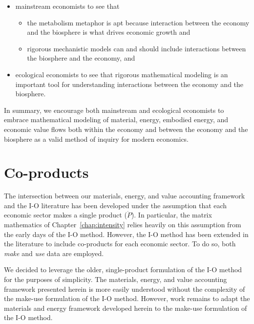 \begin{itemize}
	\item{mainstream economists to see that}
	\begin{itemize}
		\item{the metabolism metaphor is apt because 
		interaction between the economy and the biosphere is 
		what drives economic growth and}
		\item{rigorous mechanistic models can and should include 
		interactions between the biosphere and the economy, and} 
	\end{itemize}
	\item{ecological economists to see that rigorous mathematical modeling
	is an important tool for understanding interactions
	between the economy and the biosphere.}
\end{itemize}

In summary, we encourage both mainstream and ecological economists
to embrace mathematical modeling of 
material, 
energy, 
embodied energy, 
and economic value flows
both within the economy and between the economy and the biosphere
as a valid method of inquiry for modern economics.


\section{Co-products}
\label{sec:make-use}

The intersection between our materials, energy, and value accounting framework 
and the I-O literature has been developed under the assumption 
that each economic sector makes a single product ($\dot{P}$).
In particular, the matrix mathematics of Chapter~\ref{chap:intensity}
relies heavily on this assumption 
from the early days of the I-O method.\cite{Bullard:1978vd}
However, the I-O method has been extended 
in the literature to include
co-products for each economic sector.\cite{Costanza:1984tq,Casler1984} 
To do so, both \emph{make} and \emph{use} data are employed.

We decided to leverage the older,
single-product formulation of the I-O method
for the purposes of simplicity. 
The materials, energy, and value accounting framework
presented herein is more easily understood 
without the complexity of the make-use formulation 
of the I-O method.
However, work remains to adapt the materials and energy framework
developed herein to the make-use formulation of the I-O method.



